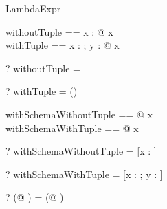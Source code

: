 \begin{zsection}
  \SECTION LambdaExpr
\end{zsection}

\begin{zed}
  withoutTuple == \lambda x : \nat @ x\\
  withTuple == \lambda x : \nat; y : \power \nat @ x
\end{zed}

\begin{zed} \vdash? withoutTuple = \nat \cross \nat \end{zed}
\begin{zed}
 \vdash? withTuple = (\nat \cross \power \nat) \cross \nat 
\end{zed}


\begin{zed}
  withSchemaWithoutTuple == \lambda [x : \nat] @ x\\
  withSchemaWithTuple ==  @ x
\end{zed}

\begin{zed}
 \vdash? withSchemaWithoutTuple = [x : \nat] \cross \nat \end{zed}
\begin{zed}
 \vdash? withSchemaWithTuple = [x : \nat; y : \power \nat] \cross \nat 
\end{zed}

\begin{zed}
 \vdash? ( @ \nat) =
         ( @ \nat)
\end{zed}

